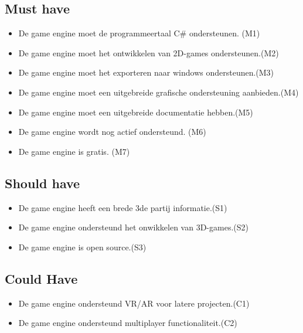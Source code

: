 \subsection{Must have}
\begin{itemize}
    \item De game engine moet de programmeertaal C\# ondersteunen. (M1)
    \item De game engine moet het ontwikkelen van 2D-games ondersteunen.(M2)
    \item De game engine moet het exporteren naar windows ondersteunen.(M3)
    \item De game engine moet een uitgebreide grafische ondersteuning aanbieden.(M4)
    \item De game engine moet een uitgebreide documentatie hebben.(M5)
    \item De game engine wordt nog actief ondersteund. (M6)
    \item De game engine is gratis. (M7)
\end{itemize}

\subsection{Should have}
\begin{itemize}
    \item De game engine heeft een brede 3de partij informatie.(S1)
    \item De game engine ondersteund het onwikkelen van 3D-games.(S2)
    \item De game engine is open source.(S3)
\end{itemize}

\subsection{Could Have}
\begin{itemize}
    \item De game engine ondersteund VR/AR voor latere projecten.(C1)
    \item De game engine ondersteund multiplayer functionaliteit.(C2)
\end{itemize}


